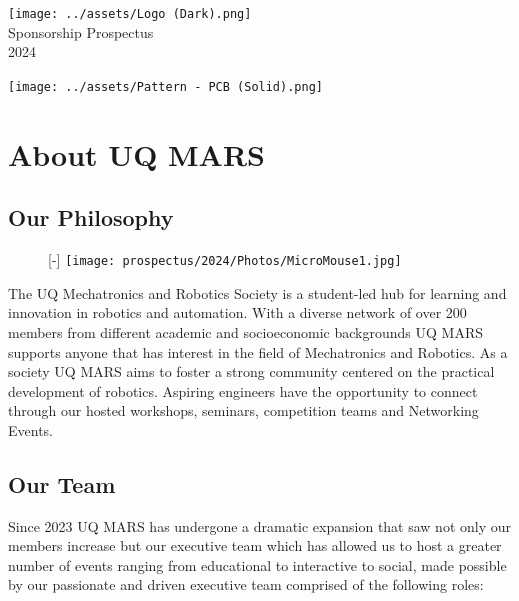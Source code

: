 \documentclass[a4paper,12pt]{report}
\begin{document}
\begin{titlepage}
    \begin{center}
        \vspace*{15mm}
        \texttt{[image: ../assets/Logo (Dark).png]} \\
        \vspace{1cm}
        \Huge Sponsorship Prospectus \\
        \huge \textcolor{turbo_purple}{2024}
    \end{center}
    \vfill
    \texttt{[image: ../assets/Pattern - PCB (Solid).png]}
    \vspace*{10mm}
\end{titlepage}
\restoregeometry

\section*{About UQ MARS}
\subsection*{Our Philosophy}

\begin{figure}
\raisebox{0pt}[\dimexpr\height-\baselineskip\relax]{
    \texttt{[image: prospectus/2024/Photos/MicroMouse1.jpg]}
}
\end{figure}

The UQ Mechatronics and Robotics Society is a student-led hub for learning and innovation in robotics and automation.
With a diverse network of over 200 members from different academic and socioeconomic backgrounds UQ MARS supports anyone that has interest in the field of Mechatronics and Robotics. As a society UQ MARS aims to foster a strong community centered on the practical development of robotics.
Aspiring engineers have the opportunity to connect through our hosted workshops, seminars, competition teams and Networking Events.

\vspace{-1.5cm}

\subsection{Our Team}

Since 2023 UQ MARS has undergone a dramatic expansion that saw not only our members increase but our executive team which has allowed us to host a greater number of events ranging from educational to interactive to social, made possible by our passionate and driven executive team comprised of the following roles:
\end{document}
